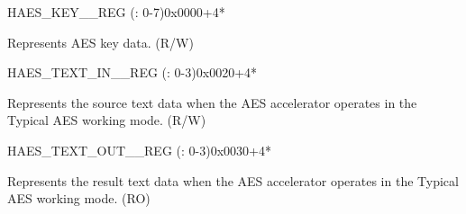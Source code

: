 \begin{register}{H}{AES\_KEY\_\_REG (: 0-7)}{0x0000+4*}\label{regdesc:AESKEYnREG}
%
\regnewline%
\begin{regdesc}\begin{reglist}
\item [AES\_KEY\_\regindex{n}\_REG (\regindex{n}: 0-7)] Represents AES key data. (R/W)
\end{reglist}\end{regdesc}
\end{register}


\begin{register}{H}{AES\_TEXT\_IN\_\_REG (: 0-3)}{0x0020+4*}\label{regdesc:AESTEXTINnREG}
%
\regnewline%
\begin{regdesc}\begin{reglist}
\item [AES\_TEXT\_IN\_\regindex{m}\_REG (\regindex{m}: 0-3)] Represents the source text data when the AES accelerator operates in the Typical AES working mode. (R/W)
\end{reglist}\end{regdesc}
\end{register}


\begin{register}{H}{AES\_TEXT\_OUT\_\_REG (: 0-3)}{0x0030+4*}\label{regdesc:AESTEXTOUTnREG}
%
\regnewline%
\begin{regdesc}\begin{reglist}
\item [AES\_TEXT\_OUT\_\regindex{m}\_REG (\regindex{m}: 0-3)] Represents the result text data when the AES accelerator operates in the Typical AES working mode. (RO)
\end{reglist}\end{regdesc}
\end{register}


